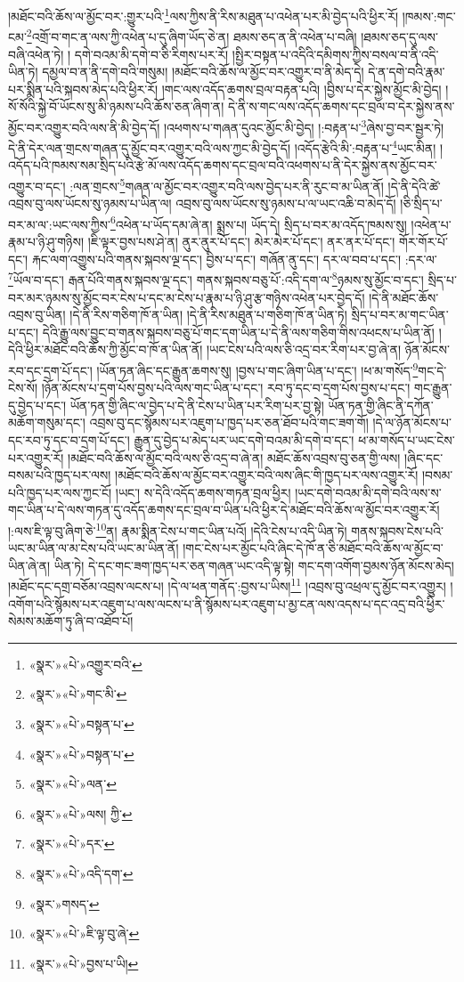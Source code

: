 །མཐོང་བའི་ཆོས་ལ་མྱོང་བར་:གྱུར་པའི་\footnote{«སྣར་»«པེ་»འགྱུར་བའི་}ལས་ཀྱིས་ནི་རིས་མཐུན་པ་འཕེན་པར་མི་བྱེད་པའི་ཕྱིར་རོ། །ཁམས་:གང་ངམ་\footnote{«སྣར་»«པེ་»གང་མི་}འགྲོ་བ་གང་ན་ལས་ཀྱི་འཕེན་པ་དུ་ཞིག་ཡོད་ཅེ་ན། ཐམས་ཅད་ན་ནི་འཕེན་པ་བཞི། །ཐམས་ཅད་དུ་ལས་བཞི་འཕེན་ཏེ། །
དགེ་བའམ་མི་དགེ་བ་ཅི་རིགས་པར་རོ། །སྤྱིར་བསྟན་པ་འདིའི་དམིགས་ཀྱིས་བསལ་བ་ནི་འདི་ཡིན་ཏེ། དམྱལ་བ་ན་ནི་དགེ་བའི་གསུམ། །མཐོང་བའི་ཆོས་ལ་མྱོང་བར་འགྱུར་བ་ནི་མེད་དེ། དེ་ན་དགེ་བའི་རྣམ་པར་སྨིན་པའི་སྐབས་མེད་པའི་ཕྱིར་རོ། །གང་ལས་འདོད་ཆགས་བྲལ་བརྟན་པའི། །བྱིས་པ་དེར་སྐྱེས་མྱོང་མི་བྱེད། །སོ་སོའི་སྐྱེ་བོ་ཡོངས་སུ་མི་ཉམས་པའི་ཆོས་ཅན་ཞིག་ན། དེ་ནི་ས་གང་ལས་འདོད་ཆགས་དང་བྲལ་བ་དེར་སྐྱེས་ནས་མྱོང་བར་འགྱུར་བའི་ལས་ནི་མི་བྱེད་དོ། །འཕགས་པ་གཞན་དུའང་མྱོང་མི་བྱེད། །:བརྟན་པ་\footnote{«སྣར་»«པེ་»བསྟན་པ་}ཞེས་བྱ་བར་སྦྱར་ཏེ། དེ་ནི་དེར་ལན་གྲངས་གཞན་དུ་མྱོང་བར་འགྱུར་བའི་ལས་ཀྱང་མི་བྱེད་དོ། །འདོད་རྩེའི་མི་:བརྟན་པ་\footnote{«སྣར་»«པེ་»བསྟན་པ་}ཡང་མིན། །འདོད་པའི་ཁམས་སམ་སྲིད་པའི་རྩེ་མོ་ལས་འདོད་ཆགས་དང་བྲལ་བའི་འཕགས་པ་ནི་དེར་སྐྱེས་ནས་མྱོང་བར་འགྱུར་བ་དང་། :ལན་གྲངས་\footnote{«སྣར་»«པེ་»ལན་}གཞན་ལ་མྱོང་བར་འགྱུར་བའི་ལས་བྱེད་པར་ནི་རུང་བ་མ་ཡིན་ནོ། །དེ་ནི་དེའི་ཚེ་འབྲས་བུ་ལས་ཡོངས་སུ་ཉམས་པ་ཡིན་ལ། འབྲས་བུ་ལས་ཡོངས་སུ་ཉམས་པ་ལ་ཡང་འཆི་བ་མེད་དོ། །ཅི་སྲིད་པ་བར་མ་ལ་:ཡང་ལས་ཀྱིས་\footnote{«སྣར་»«པེ་»ལས། ཀྱི་}འཕེན་པ་ཡོད་དམ་ཞེ་ན། སྨྲས་པ། ཡོད་དེ། སྲིད་པ་བར་མ་འདོད་ཁམས་སུ། །འཕེན་པ་རྣམ་པ་ཉི་ཤུ་གཉིས། །ཇི་ལྟར་བྱས་པས་ཤེ་ན། ནུར་ནུར་པོ་དང་། མེར་མེར་པོ་དང་། ནར་ནར་པོ་དང་། གོར་གོར་པོ་དང་། རྐང་ལག་འགྱུས་པའི་གནས་སྐབས་ལྔ་དང་། བྱིས་པ་དང་། གཞོན་ནུ་དང་། དར་ལ་བབ་པ་དང་། :དར་ལ་\footnote{«སྣར་»«པེ་»དར་}ཡོལ་བ་དང་། རྒན་པོའི་གནས་སྐབས་ལྔ་དང་། གནས་སྐབས་བཅུ་པོ་:འདི་དག་ལ་\footnote{«སྣར་»«པེ་»འདི་དག་}ཉམས་སུ་མྱོང་བ་དང་། སྲིད་པ་བར་མར་ཉམས་སུ་མྱོང་བར་ངེས་པ་དང་མ་ངེས་པ་རྣམ་པ་ཉི་ཤུ་རྩ་གཉིས་འཕེན་པར་བྱེད་དོ། །དེ་ནི་མཐོང་ཆོས་འབྲས་བུ་ཡིན། །དེ་ནི་རིས་གཅིག་ཁོ་ན་ཡིན། །དེ་ནི་རིས་མཐུན་པ་གཅིག་ཁོ་ན་ཡིན་ཏེ། སྲིད་པ་བར་མ་གང་ཡིན་པ་དང་། དེའི་རྒྱུ་ལས་བྱུང་བ་གནས་སྐབས་བཅུ་པོ་གང་དག་ཡིན་པ་དེ་ནི་ལས་གཅིག་གིས་འཕངས་པ་ཡིན་ནོ། །དེའི་ཕྱིར་མཐོང་བའི་ཆོས་ཀྱི་མྱོང་བ་ཁོ་ན་ཡིན་ནོ། །ཡང་ངེས་པའི་ལས་ཅི་འདྲ་བར་རིག་པར་བྱ་ཞེ་ན། ཉོན་མོངས་རབ་དང་དྲག་པོ་དང་། །ཡོན་ཏན་ཞིང་དང་རྒྱུན་ཆགས་སུ། །བྱས་པ་གང་ཞིག་ཡིན་པ་དང་། །ཕ་མ་གསོད་\footnote{«སྣར་»གསད་}གང་དེ་ངེས་སོ། །ཉོན་མོངས་པ་དྲག་པོས་བྱས་པའི་ལས་གང་ཡིན་པ་དང་། རབ་ཏུ་དང་བ་དྲག་པོས་བྱས་པ་དང་། གང་རྒྱུན་དུ་བྱེད་པ་དང་། ཡོན་ཏན་གྱི་ཞིང་ལ་བྱེད་པ་དེ་ནི་ངེས་པ་ཡིན་པར་རིག་པར་བྱ་སྟེ། ཡོན་ཏན་གྱི་ཞིང་ནི་དཀོན་མཆོག་གསུམ་དང་། འབྲས་བུ་དང་སྙོམས་པར་འཇུག་པ་ཁྱད་པར་ཅན་ཐོབ་པའི་གང་ཟག་གོ། །དེ་ལ་ཉོན་མོངས་པ་དང་རབ་ཏུ་དང་བ་དྲག་པོ་དང་། རྒྱུན་དུ་བྱེད་པ་མེད་པར་ཡང་དགེ་བའམ་མི་དགེ་བ་དང་། ཕ་མ་གསོད་པ་ཡང་ངེས་པར་འགྱུར་རོ། །མཐོང་བའི་ཆོས་ལ་མྱོང་བའི་ལས་ཅི་འདྲ་བ་ཞེ་ན། མཐོང་ཆོས་འབྲས་བུ་ཅན་གྱི་ལས། །ཞིང་དང་བསམ་པའི་ཁྱད་པར་ལས། །མཐོང་བའི་ཆོས་ལ་མྱོང་བར་འགྱུར་བའི་ལས་ཞིང་གི་ཁྱད་པར་ལས་འགྱུར་རོ། །བསམ་པའི་ཁྱད་པར་ལས་ཀྱང་ངོ། །ཡང་། ས་དེའི་འདོད་ཆགས་གཏན་བྲལ་ཕྱིར། །ཡང་དགེ་བའམ་མི་དགེ་བའི་ལས་ས་གང་ཡིན་པ་དེ་ལས་གཏན་དུ་འདོད་ཆགས་དང་བྲལ་བ་ཡིན་པའི་ཕྱིར་དེ་མཐོང་བའི་ཆོས་ལ་མྱོང་བར་འགྱུར་རོ། །:ལས་ཇི་ལྟ་བུ་ཞིག་ཅེ་\footnote{«སྣར་»«པེ་»ཇི་ལྟ་བུ་ཞེ་}ན། རྣམ་སྨིན་ངེས་པ་གང་ཡིན་པའོ། །དེའི་ངེས་པ་འདི་ཡིན་ཏེ། གནས་སྐབས་ངེས་པའི་ཡང་མ་ཡིན་ལ་མ་ངེས་པའི་ཡང་མ་ཡིན་ནོ། །གང་ངེས་པར་མྱོང་པའི་ཞིང་དེ་ཁོ་ན་ཅི་མཐོང་བའི་ཆོས་ལ་མྱོང་བ་ཡིན་ཞེ་ན། ཡིན་ཏེ། དེ་དང་གང་ཟག་ཁྱད་པར་ཅན་གཞན་ཡང་འདི་ལྟ་སྟེ། གང་དག་འགོག་བྱམས་ཉོན་མོངས་མེད། །མཐོང་དང་དགྲ་བཅོམ་འབྲས་ལངས་པ། །དེ་ལ་ཕན་གནོད་:བྱས་པ་ཡིས།\footnote{«སྣར་»«པེ་»བྱས་པ་ཡི།} །འབྲས་བུ་འཕྲལ་དུ་མྱོང་བར་འགྱུར། །འགོག་པའི་སྙོམས་པར་འཇུག་པ་ལས་ལངས་པ་ནི་སྙོམས་པར་འཇུག་པ་མྱ་ངན་ལས་འདས་པ་དང་འདྲ་བའི་ཕྱིར་སེམས་མཆོག་ཏུ་ཞི་བ་འཐོབ་པོ། 